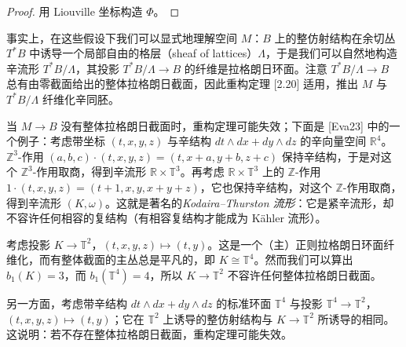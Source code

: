 
\begin{proof}
用 Liouville 坐标构造 $\Phi$。
\end{proof}


事实上，在这些假设下我们可以显式地理解空间 $M$：$B$ 上的整仿射结构在余切丛 $T^{\ast} B$ 中诱导一个局部自由的格层（sheaf of lattices）$\Lambda$，于是我们可以自然地构造辛流形 $T^{\ast} B/\Lambda$，其投影 $T^{\ast} B/\Lambda\to B$ 的纤维是拉格朗日环面。注意 $T^{\ast} B/\Lambda\to B$ 总有由零截面给出的整体拉格朗日截面，因此重构定理 [2.20] 适用，推出 $M$ 与 $T^{\ast} B/\Lambda$ 纤维化辛同胚。


\begin{example*}
当 $M\to B$ 没有整体拉格朗日截面时，重构定理可能失效；下面是 [Eva23] 中的一个例子：考虑带坐标 $(t,x,y,z)$ 与辛结构 $dt\wedge dx+dy\wedge dz$ 的辛向量空间 $\mathbb{R}^4$。$\mathbb{Z}^3$-作用 $(a,b,c)\cdot (t,x,y,z)=(t,x+a,y+b,z+c)$ 保持辛结构，于是对这个 $\mathbb{Z}^3$-作用取商，得到辛流形 $\mathbb{R}\times\mathbb{T}^3$。再考虑 $\mathbb{R}\times\mathbb{T}^3$ 上的 $\mathbb{Z}$-作用 $1\cdot (t,x,y,z)=(t+1,x,y,x+y+z)$，它也保持辛结构，对这个 $\mathbb{Z}$-作用取商，得到辛流形 $(K,\omega)$。这就是著名的\emph{Kodaira--Thurston 流形}：它是紧辛流形，却不容许任何相容的复结构（有相容复结构才能成为 Kähler 流形）。

考虑投影 $K\to\mathbb{T}^2$，$(t,x,y,z)\mapsto (t,y)$。这是一个（主）正则拉格朗日环面纤维化，而有整体截面的主丛总是平凡的，即 $K\cong\mathbb{T}^4$。然而我们可以算出 $b_1 (K)=3$，而 $b_1 (\mathbb{T}^4)=4$，所以 $K\to\mathbb{T}^2$ 不容许任何整体拉格朗日截面。

另一方面，考虑带辛结构 $dt\wedge dx+dy\wedge dz$ 的标准环面 $\mathbb{T}^4$ 与投影 $\mathbb{T}^4\to\mathbb{T}^2$，$(t,x,y,z)\mapsto (t,y)$；它在 $\mathbb{T}^2$ 上诱导的整仿射结构与 $K\to\mathbb{T}^2$ 所诱导的相同。这说明：若不存在整体拉格朗日截面，重构定理可能失效。
\end{example*}

